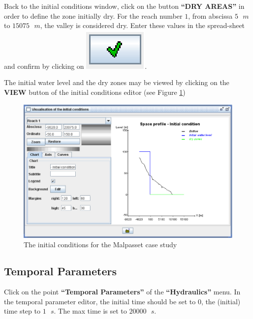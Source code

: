 \documentclass[a4paper,12pt]{article}
\begin{document}
Back to the initial conditions window, click on the button \textbf{{}``DRY
AREAS''} in order to define the zone initially dry. For the reach
number $1$, from abscissa $5\mbox{ }m$ to $15075\mbox{ }m$, the valley is considered dry.
Enter these values in the spread-sheet and confirm by clicking on
\includegraphics[scale=0.6]{valid}.

\vspace{0.5cm}

The initial water level and the dry zones may be viewed by clicking
on the\textbf{ VIEW} button of the initial conditions editor (see
Figure \ref{fig:The-initial-conditions})

\begin{figure}[h]
  \begin{center}
  \includegraphics[scale=0.5]{initial_cond}         
  \caption{The initial conditions for the Malpasset case study}
  \label{fig:The-initial-conditions}
  \end{center}
\end{figure}

\subsection{Temporal Parameters}

\hspace{0.5cm}Click on the point\textbf{ {}``Temporal Parameters''} of the\textbf{
{}``Hydraulics''} menu. In the temporal parameter editor, the initial
time should be set to $0$, the (initial) time step to $1\mbox{ }s$. The max time
is set to $20000\mbox{ }s$. 
\end{document}
